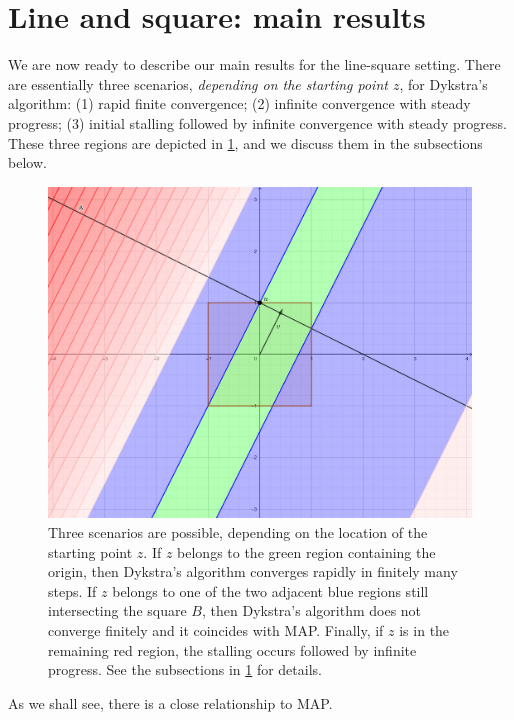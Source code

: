 \documentclass[12pt]{article}
\begin{document}
\section{Line and square: main results}

\label{s:main}

We are now ready to describe our main results for the line-square setting. 
There are essentially three scenarios, \emph{depending on the starting point $z$}, 
for Dykstra's algorithm:
(1) rapid finite convergence; 
(2) infinite convergence with steady progress; 
(3) initial stalling followed by infinite convergence with steady progress.
These three regions are depicted in \cref{fig:regions}, 
and we discuss them in the subsections below. 
\begin{figure}[h!]
  \begin{center}
  \includegraphics[scale=1.8]{StallingRegionsHand}
  \caption{Three scenarios are possible, 
  depending on the location of the starting point $z$.
  If $z$ belongs to the green region 
  containing the origin, then Dykstra's algorithm converges rapidly 
  in finitely many steps. If $z$ belongs to one of the two 
  adjacent blue regions still intersecting the square $B$, 
  then Dykstra's algorithm does not
  converge finitely and it coincides with MAP. Finally, if $z$ is in the 
  remaining red region, the stalling occurs followed by infinite progress. 
  See the subsections in \cref{s:main} for details.}
  \label{fig:regions}
  \end{center}
\end{figure}
As we shall see, there is a close relationship to MAP. 
\end{document}
